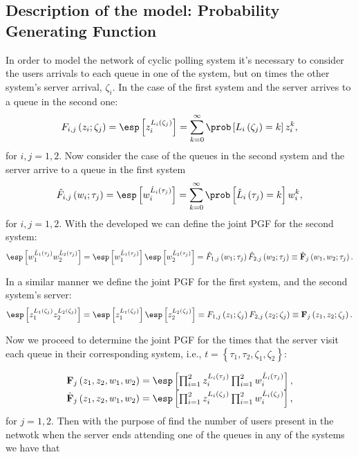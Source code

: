 \subsection{Description of the model: Probability Generating Function}
%

In order to model the network of cyclic polling system it's necessary to consider the users arrivals to each queue in one of the system, but on times the other system's server arrival, $\zeta_{i}$. In the case of the first system and the server arrives to a queue in the second one: $$F_{i,j}\left(z_{i};\zeta_{j}\right)=\esp\left[z_{i}^{L_{i}\left(\zeta_{j}\right)}\right]=
\sum_{k=0}^{\infty}\prob\left[L_{i}\left(\zeta_{j}\right)
=k\right]z_{i}^{k},$$ for $i,j=1,2$. Now consider the case of the queues in the second system and the server arrive to a queue in the first system $$\hat{F}_{i,j}\left(w_{i};\tau_{j}\right)=\esp\left[w_{i}^{\hat{L}_{i}\left(\tau_{j}\right)}\right] =\sum_{k=0}^{\infty}\prob\left[\hat{L}_{i}\left(\tau_{j}\right)
=k\right]w_{i}^{k},$$ for $i,j=1,2$. With the developed we can define the joint PGF for the second system:
$$\esp\left[w_{1}^{\hat{L}_{1}\left(\tau_{j}\right)}w_{2}^{\hat{L}_{2}\left(\tau_{j}\right)}\right]
=\esp\left[w_{1}^{\hat{L}_{1}\left(\tau_{j}\right)}\right]
\esp\left[w_{2}^{\hat{L}_{2}\left(\tau_{j}\right)}\right]=\hat{F}_{1,j}\left(w_{1};\tau_{j}\right)\hat{F}_{2,j}\left(w_{2};\tau_{j}\right)\equiv\hat{\mathbf{F}}_{j}\left(w_{1},w_{2};\tau_{j}\right).$$

In a similar manner we define the joint PGF for the first system, and the second system's server:
$$\esp\left[z_{1}^{L_{1}\left(\zeta_{j}\right)}z_{2}^{L_{2}\left(\zeta_{j}\right)}\right]
=\esp\left[z_{1}^{L_{1}\left(\zeta_{j}\right)}\right]
\esp\left[z_{2}^{L_{2}\left(\zeta_{j}\right)}\right]=F_{1,j}\left(z_{1};\zeta_{j}\right)F_{2,j}\left(z_{2};\zeta_{j}\right)\equiv\mathbf{F}_{j}\left(z_{1},z_{2};\zeta_{j}\right).$$

Now we proceed to determine the joint PGF for the times that the server visit each queue in their corresponding system, i.e., $t=\left\{\tau_{1},\tau_{2},\zeta_{1},\zeta_{2}\right\}$:

\begin{eqnarray}\label{Eq.Conjuntas}
\begin{array}{l}
\mathbf{F}_{j}\left(z_{1},z_{2},w_{1},w_{2}\right)=\esp\left[\prod_{i=1}^{2}z_{i}^{L_{i}\left(\tau_{j}
\right)}\prod_{i=1}^{2}w_{i}^{\hat{L}_{i}\left(\tau_{j}\right)}\right],\\
\hat{\mathbf{F}}_{j}\left(z_{1},z_{2},w_{1},w_{2}\right)=\esp\left[\prod_{i=1}^{2}z_{i}^{L_{i}
\left(\zeta_{j}\right)}\prod_{i=1}^{2}w_{i}^{\hat{L}_{i}\left(\zeta_{j}\right)}\right],
\end{array}
\end{eqnarray} for $j=1,2$. Then with the purpose of find the number of users present in the netwotk when the server ends attending one of the queues in any of the systems we have that

